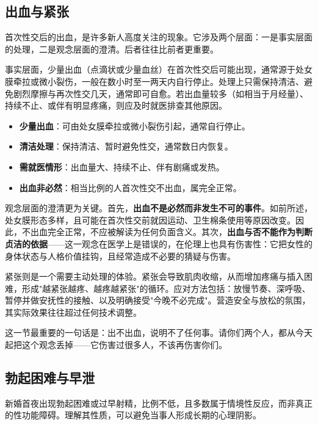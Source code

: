 \documentclass[12pt,UTF8]{ctexbook}
\newcommand{\keyword}[1]{\textbf{#1}}
\begin{document}
\subsection{出血与紧张}

首次性交后的出血，是许多新人高度关注的现象。它涉及两个层面：一是事实层面的处理，二是观念层面的澄清。后者往往比前者更重要。

事实层面，少量出血（点滴状或少量血丝）在首次性交后可能出现，通常源于处女膜牵拉或微小裂伤，一般在数小时至一两天内自行停止。处理上只需保持清洁、避免剧烈摩擦与再次性交几天，通常即可自愈。若出血量较多（如相当于月经量）、持续不止、或伴有明显疼痛，则应及时就医排查其他原因。

\begin{itemize}
	\item \keyword{少量出血}：可由处女膜牵拉或微小裂伤引起，通常自行停止。
	\item \keyword{清洁处理}：保持清洁、暂时避免性交，通常数日内恢复。
	\item \keyword{需就医情形}：出血量大、持续不止、伴有剧痛或发热。
	\item \keyword{出血非必然}：相当比例的人首次性交不出血，属完全正常。
\end{itemize}

观念层面的澄清更为关键。首先，\keyword{出血不是必然而非发生不可的事件}。如前所述，处女膜形态多样，且可能在首次性交前就因运动、卫生棉条使用等原因改变。因此，不出血完全正常，不应被解读为任何负面含义。其次，\keyword{出血与否不能作为判断贞洁的依据}——这一观念在医学上是错误的，在伦理上也具有伤害性：它把女性的身体状态与人格价值挂钩，且经常造成不必要的猜疑与伤害。

紧张则是一个需要主动处理的体验。紧张会导致肌肉收缩，从而增加疼痛与插入困难，形成"越紧张越疼、越疼越紧张"的循环。应对方法包括：放慢节奏、深呼吸、暂停并做安抚性的接触、以及明确接受"今晚不必完成"。营造安全与放松的氛围，其实际效果往往超过任何技术调整。

\begin{tcolorbox}[colback=pink!5!white,colframe=red!50!black,title=贴心小叮咛]
	这一节最重要的一句话是：出不出血，说明不了任何事。请你们两个人，都从今天起把这个观念丢掉——它伤害过很多人，不该再伤害你们。
\end{tcolorbox}
\subsection{勃起困难与早泄}

新婚首夜出现勃起困难或过早射精，比例不低，且多数属于情境性反应，而非真正的性功能障碍。理解其性质，可以避免当事人形成长期的心理阴影。
\end{document}
